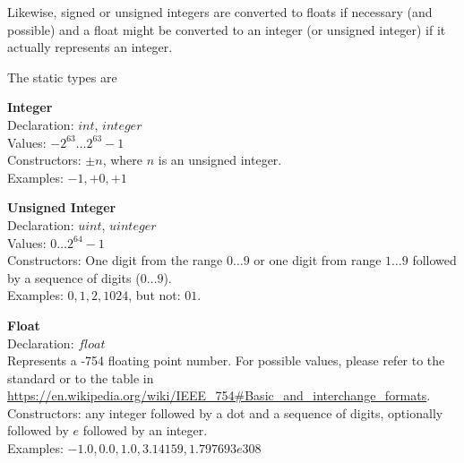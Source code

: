 Likewise, signed or unsigned integers are converted to floats
if necessary (and possible) and a float might be converted
to an integer (or unsigned integer) if it actually
represents an integer.

The static types are

\begin{minipage}{\textwidth}
\textbf{Integer}\\
Declaration: $int$, $integer$ \\
Values: $-2^{63} \dots 2^{63}-1$ \\
Constructors: $\pm n$, where $n$ is an unsigned integer.\\
Examples: $-1, +0, +1$
\end{minipage}

\begin{minipage}{\textwidth}
\textbf{Unsigned Integer} \\
Declaration: $uint$, $uinteger$ \\
Values: $0 \dots 2^{64}-1$  \\
Constructors: One digit from the range $0\dots 9$
or one digit from range $1\dots 9$ followed by
a sequence of digits ($0\dots9$). \\
Examples: $0, 1, 2, 1024$, but not: $01$.
\end{minipage}

\begin{minipage}{\textwidth}
\textbf{Float} \\
Declaration: $float$ \\
Represents a  -754 floating point number.
For possible values, please refer to the standard or to the table in
\url{https://en.wikipedia.org/wiki/IEEE\_754#Basic\_and\_interchange\_formats}.\\
Constructors: any integer followed by a dot and a sequence of digits,
              optionally followed by $e$ followed by an integer.
               \\
Examples: $-1.0, 0.0, 1.0, 3.14159, 1.797693e308$ 
\end{minipage}

